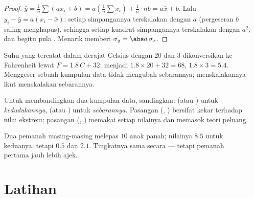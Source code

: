 \begin{proof}
$\bar y = \frac1n \sum (a x_i + b) = a\left(\frac1n\sum x_i\right) +
\frac1n \cdot nb = a\bar x + b$. Lalu
$y_i - \bar y = a(x_i - \bar x)$: setiap simpangannya terskalakan dengan $a$
(pergeseran $b$ saling menghapus), sehingga setiap kuadrat simpangannya
terskalakan dengan $a^2$, dan begitu pula . Menarik  memberi
$\sigma_y = \abs a\,\sigma_x$.
\end{proof}

\begin{example}
Suhu yang tercatat dalam derajat Celsius dengan  $20$ dan  $3$ dikonversikan ke Fahrenheit lewat $F = 1.8\,C + 32$: 
menjadi $1.8 \times 20 + 32 = 68$, 
$1.8 \times 3 = 5.4$. Menggeser sebuah kumpulan data tidak mengubah sebarannya;
menskalakannya ikut menskalakan sebarannya.
\end{example}

\begin{method}\label{met:g11:stat:compare}
Untuk membandingkan dua kumpulan data, sandingkan:  (atau ) untuk
\emph{kedudukannya},  (atau ) untuk
\emph{sebarannya}. Pasangan (, ) bersifat kekar
terhadap nilai ekstrem; pasangan (, ) memakai setiap
nilainya dan memasok teori peluang.
\end{method}

\begin{example}
Dua pemanah masing-masing melepas $10$ anak panah; nilainya  $8.5$
untuk keduanya, tetapi  $0.5$ dan $2.1$. Tingkatnya sama
secara  --- tetapi pemanah pertama jauh lebih ajek.
\end{example}

\section{Latihan}

